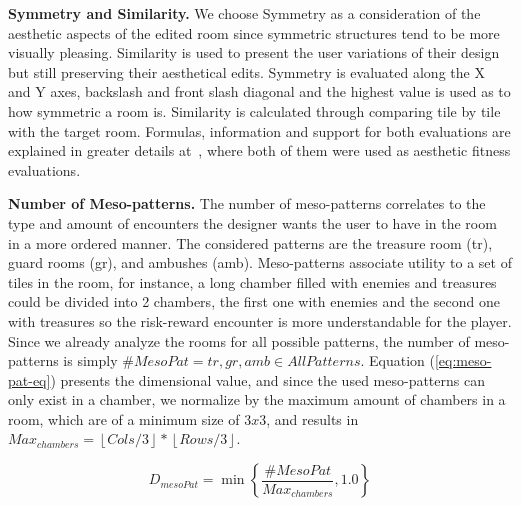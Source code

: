 \textbf{Symmetry and Similarity.} We choose Symmetry as a consideration of the aesthetic aspects of the edited room since symmetric structures tend to be more visually pleasing. Similarity is used to present the user variations of their design but still preserving their aesthetical edits. Symmetry is evaluated along the X and Y axes, backslash and front slash diagonal and the highest value is used as to how symmetric a room is. Similarity is calculated through comparing tile by tile with the target room. Formulas, information and support for both evaluations are explained in greater details at~, where both of them were used as aesthetic fitness evaluations.

\textbf{Number of Meso-patterns.} The number of meso-patterns correlates to the type and amount of encounters the designer wants the user to have in the room in a more ordered manner. The considered patterns are the treasure room (tr), guard rooms (gr), and ambushes (amb). Meso-patterns associate utility to a set of tiles in the room, for instance, a long chamber filled with enemies and treasures could be divided into 2 chambers, the first one with enemies and the second one with treasures so the risk-reward encounter is more understandable for the player. Since we already analyze the rooms for all possible patterns, the number of meso-patterns is simply $\#MesoPat=tr, gr, amb \in AllPatterns$. Equation (\ref{eq:meso-pat-eq}) presents the dimensional value, and since the used meso-patterns can only exist in a chamber, we normalize by the maximum amount of chambers in a room, which are of a minimum size of $3x3$, and results in $Max_{chambers}=\left\lfloor Cols/3 \right\rfloor * \left\lfloor Rows/3 \right\rfloor$.



\begin{equation} \label{eq:meso-pat-eq}
D_{mesoPat} = \min \left\{ \dfrac{\#MesoPat}{Max_{chambers}}, 1.0 \right\}
\end{equation}


